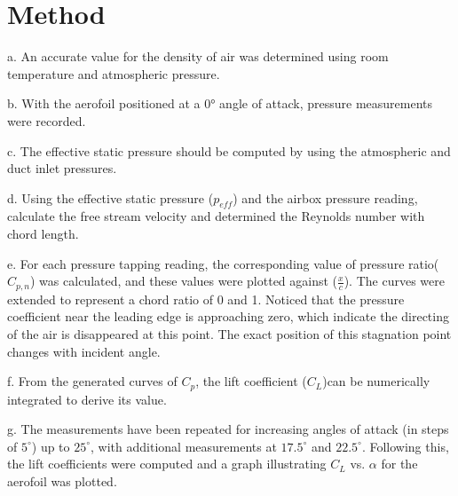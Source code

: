 \section{Method}
\FloatBarrier %

a. An accurate value for the density of air was determined using room temperature and atmospheric pressure.

b. With the aerofoil positioned at a 0° angle of attack, pressure measurements were recorded.

c. The effective static pressure should be computed by using the atmospheric and duct inlet pressures.

d. Using the effective static pressure ($p_{eff}$) and the airbox pressure reading, calculate the free stream velocity and determined the Reynolds number with chord length. 

e. For each pressure tapping reading, the corresponding value of pressure ratio($C_{p,n}$) was calculated, and these values were plotted against ($\frac{x}{c}$). The curves were extended to represent a chord ratio of 0 and 1. Noticed that the pressure coefficient near the leading edge is approaching zero, which indicate the directing of the air is disappeared at this point. The exact position of this stagnation point changes with incident angle.

f. From the generated curves of $C_p$, the lift coefficient ($C_L$)can be numerically integrated to derive its value.

g. The measurements have been repeated for increasing angles of attack (in steps of $5^\circ$) up to $25^\circ$, with additional measurements at $17.5^\circ$ and $22.5^\circ$.
Following this, the lift coefficients were computed and a graph illustrating $C_L$ vs. $\alpha$ for the aerofoil was plotted.